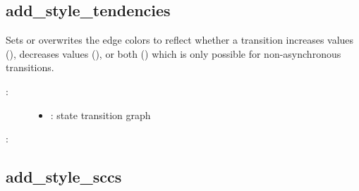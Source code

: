 \documentclass[letterpaper,10pt,english]{sphinxmanual}
\begin{document}
\subsection{add\_style\_tendencies}
\label{\detokenize{StateTransitionGraphs:id22}}\label{\detokenize{StateTransitionGraphs:add-style-tendencies}}

\begin{fulllineitems}
\label{\detokenize{StateTransitionGraphs:PyBoolNet.StateTransitionGraphs.add_style_tendencies}}
Sets or overwrites the edge colors to reflect whether a transition increases values (),
decreases values (), or both () which is only possible for non-asynchronous transitions.
\begin{description}
\item[{:}] \leavevmode\begin{itemize}
\item {} 
: state transition graph

\end{itemize}

\end{description}

:

\begin{sphinxVerbatim}[commandchars=\\\{\}]
\end{sphinxVerbatim}

\end{fulllineitems}



\subsection{add\_style\_sccs}
\label{\detokenize{StateTransitionGraphs:add-style-sccs}}\label{\detokenize{StateTransitionGraphs:stgs-add-style-sccs}}
\end{document}

